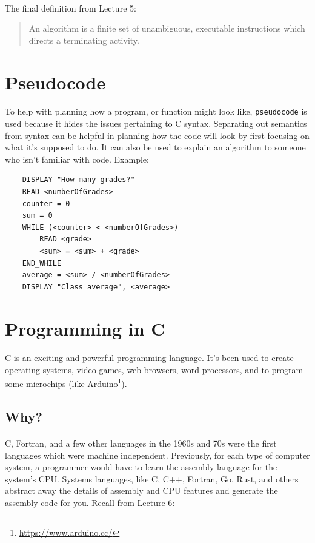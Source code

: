 \documentclass[letter,11pt]{article}
\begin{document}
\paragraph{}The final definition from Lecture 5:
\begin{quote}
An algorithm is a finite set of unambiguous, executable instructions which directs a terminating activity.
\end{quote}

\section{Pseudocode}
\paragraph{}To help with planning how a program, or function might look like, \texttt{pseudocode} is used because it hides the issues pertaining to C syntax. Separating out semantics from syntax can be helpful in planning how the code will look by first focusing on what it's supposed to do. It can also be used to explain an algorithm to someone who isn't familiar with code. Example:

\begin{verbatim}
    DISPLAY "How many grades?"
    READ <numberOfGrades>
    counter = 0
    sum = 0
    WHILE (<counter> < <numberOfGrades>)
        READ <grade>
        <sum> = <sum> + <grade>
    END_WHILE
    average = <sum> / <numberOfGrades>
    DISPLAY "Class average", <average>
\end{verbatim}

\section{Programming in C}
\paragraph{}C is an exciting and powerful programming language. It's been used to create operating systems, video games, web browsers, word processors, and to program some microchips (like Arduino\footnote{\url{https://www.arduino.cc/}}).

\subsection{Why?}
\paragraph{}C, Fortran, and a few other languages in the 1960s and 70s were the first languages which were machine independent. Previously, for each type of computer system, a programmer would have to learn the assembly language for the system's CPU. Systems languages, like C, C++, Fortran, Go, Rust, and others abstract away the details of assembly and CPU features and generate the assembly code for you. Recall from Lecture 6:
\end{document}
